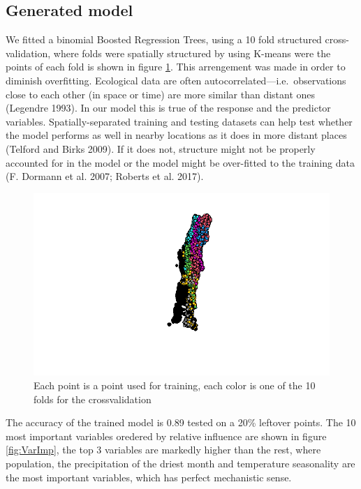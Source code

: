\documentclass[
]{article}
\begin{document}
\hypertarget{generated-model}{%
\subsection{Generated model}\label{generated-model}}

We fitted a binomial Boosted Regression Trees, using a 10 fold structured cross-validation, where folds were spatially structured by using K-means were the points of each fold is shown in figure \ref{fig:kmeans}. This arrengement was made in order to diminish overfitting. Ecological data are often autocorrelated---i.e.~observations close to each other (in space or time) are more similar than distant ones (Legendre 1993). In our model this is true of the response and the predictor variables. Spatially-separated training and testing datasets can help test whether the model performs as well in nearby locations as it does in more distant places (Telford and Birks 2009). If it does not, structure might not be properly accounted for in the model or the model might be over-fitted to the training data (F. Dormann et al. 2007; Roberts et al. 2017).

\begin{figure}
\includegraphics[width=9.72in]{Kmeans} \caption{Each point is a point used for training, each color is one of the 10 folds for the crossvalidation}\label{fig:kmeans}
\end{figure}

The accuracy of the trained model is 0.89 tested on a 20\% leftover points. The 10 most important variables oredered by relative influence are shown in figure \ref{fig:VarImp}, the top 3 variables are markedly higher than the rest, where population, the precipitation of the driest month and temperature seasonality are the most important variables, which has perfect mechanistic sense.
\end{document}
